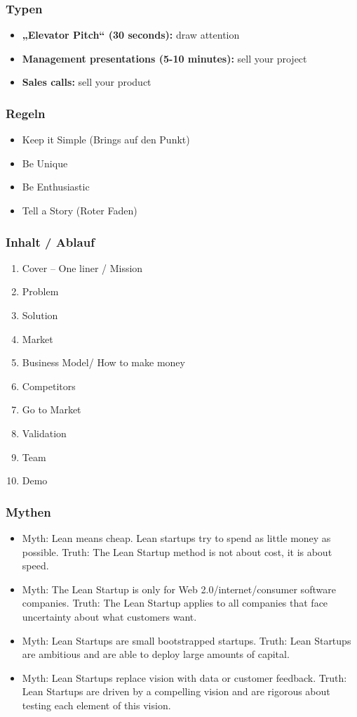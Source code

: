 \subsubsection{Typen}
\begin{itemize}
	\item \textbf{„Elevator Pitch“ (30 seconds):} draw attention
	\item \textbf{Management presentations (5-10 minutes):} sell your project
	\item \textbf{Sales calls:} sell your product
\end{itemize}

\subsubsection{Regeln}
\begin{itemize}
	\item Keep it Simple (Brings auf den Punkt)
	\item Be Unique
	\item Be Enthusiastic
	\item Tell a Story (Roter Faden)
\end{itemize}

\subsubsection{Inhalt / Ablauf}
\begin{enumerate}
	\item Cover – One liner / Mission
	\item Problem
	\item Solution
	\item Market
	\item Business Model/ How to make money
	\item Competitors
	\item Go to Market
	\item Validation
	\item Team
	\item Demo	
\end{enumerate}

\subsubsection{Mythen}
\begin{itemize}
	\item Myth: Lean means cheap. Lean startups try to spend as little money as possible. Truth: The Lean Startup method is not about cost, it is about speed.
	\item Myth: The Lean Startup is only for Web 2.0/internet/consumer software companies. Truth: The Lean Startup applies to all companies that face uncertainty about what customers want.
	\item Myth: Lean Startups are small bootstrapped startups. Truth: Lean Startups are ambitious and are able to deploy large amounts of capital.
	\item Myth: Lean Startups replace vision with data or customer feedback. Truth: Lean Startups are driven by a compelling vision and are rigorous about testing each element of this vision.
\end{itemize}

